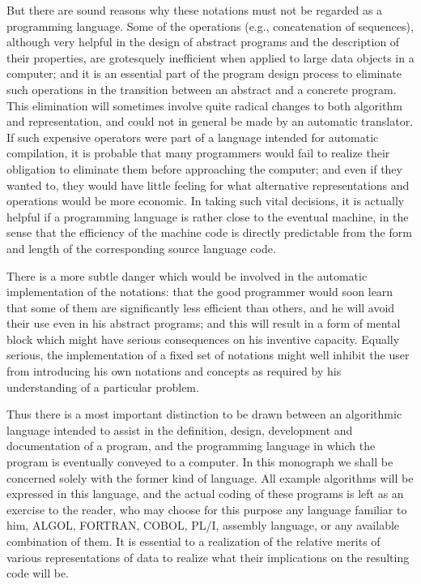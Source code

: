 \documentclass[twoside,11pt]{book}
\begin{document}
But there are sound reasons why these notations must not be regarded as a programming language. Some of the operations (e.g., concatenation of sequences), although very helpful in the design of abstract programs and the description of their properties, are grotesquely inefficient when applied to large data objects in a computer; and it is an essential part of the program design process to eliminate such operations in the transition between an abstract and a concrete program. This elimination will sometimes involve quite radical changes to both algorithm and representation, and could not in general be made by an automatic translator. If such expensive operators were part of a language intended for automatic compilation, it is probable that many programmers would fail to realize their obligation to eliminate them before approaching the computer; and even if they wanted to, they would have little feeling for what alternative representations and operations would be more economic. In taking such vital decisions, it is actually helpful if a programming language is rather close to the eventual machine, in the sense that the efficiency of the machine code is directly predictable from the form and length of the corresponding source language code.

There is a more subtle danger which would be involved in the automatic implementation of the notations: that the good programmer would soon learn that some of them are significantly less efficient than others, and he will avoid their use even in his abstract programs; and this will result in a form of mental block which might have serious consequences on his inventive capacity. Equally serious, the implementation of a fixed set of notations might well inhibit the user from introducing his own notations and concepts as required by his understanding of a particular problem.

Thus there is a most important distinction to be drawn between an algorithmic language intended to assist in the definition, design, development and documentation of a program, and the programming language in which the program is eventually conveyed to a computer. In this monograph we shall be concerned solely with the former kind of language. All example algorithms will be expressed in this language, and the actual coding of these programs is left as an exercise to the reader, who may choose for this purpose any language familiar to him, ALGOL, FORTRAN, COBOL, PL/I, assembly language, or any available combination of them. It is essential to a realization of the relative merits of various representations of data to realize what their implications on the resulting code will be.
\end{document}
